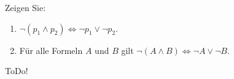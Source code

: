 
\begin{exercise}[18]

Zeigen Sie:

\begin{enumerate}[label = \alph*]
    \item $\neg (p_1 \land p_2) \Leftrightarrow \neg p_1 \lor \neg p_2$.
    \item Für alle Formeln $A$ und $B$ gilt $\neg (A \land B) \Leftrightarrow \neg A \lor \neg B$.
\end{enumerate}

\end{exercise}


\begin{solution}

ToDo!

\end{solution}

